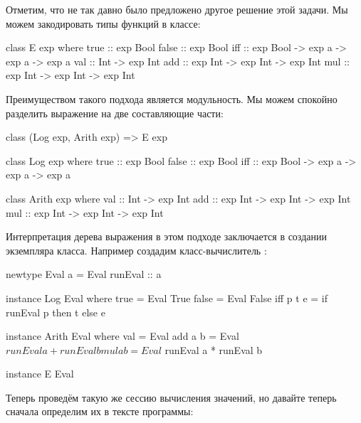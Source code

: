 Отметим, что не так давно было предложено другое решение этой задачи. Мы
можем закодировать типы функций в классе:


\begin{code}
class E exp where
    true    :: exp Bool
    false   :: exp Bool
    iff     :: exp Bool -> exp a -> exp a -> exp a
    val     :: Int -> exp Int
    add     :: exp Int -> exp Int -> exp Int
    mul     :: exp Int -> exp Int -> exp Int    
\end{code}

Преимуществом такого подхода является модульность. Мы можем спокойно
разделить выражение на две составляющие части:


\begin{code}
class (Log exp, Arith exp) => E exp

class Log exp where
    true    :: exp Bool
    false   :: exp Bool
    iff     :: exp Bool -> exp a -> exp a -> exp a

class Arith exp where
    val     :: Int -> exp Int
    add     :: exp Int -> exp Int -> exp Int
    mul     :: exp Int -> exp Int -> exp Int
\end{code}

Интерпретация дерева выражения в этом подходе заключается в создании
экземпляра класса. Например создадим класс-вычислитель :


\begin{code}
newtype Eval a = Eval { runEval :: a }

instance Log Eval where
    true    = Eval True
    false   = Eval False
    iff p t e = if runEval p then t else e

instance Arith Eval where
    val     = Eval
    add a b = Eval $ runEval a + runEval b
    mul a b = Eval $ runEval a * runEval b

instance E Eval
\end{code}

Теперь проведём такую же сессию вычисления значений, но давайте теперь
сначала определим их в тексте программы:



